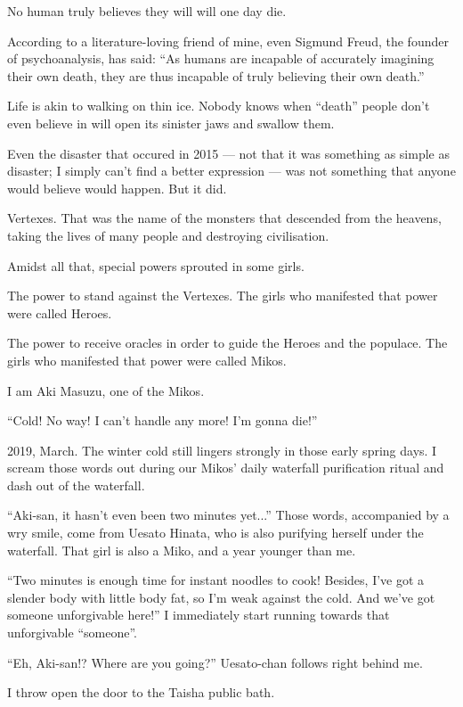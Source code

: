 

No human truly believes they will will one day die.

According to a literature-loving friend of mine, even Sigmund Freud, the founder of psychoanalysis, has said: ``As humans are incapable of accurately imagining their own death, they are thus incapable of truly believing their own death.''

Life is akin to walking on thin ice. Nobody knows when ``death'' people don't even believe in will open its sinister jaws and swallow them.

Even the disaster that occured in 2015 --- not that it was something as simple as disaster; I simply can't find a better expression --- was not something that anyone would believe would happen. But it did.

Vertexes. That was the name of the monsters that descended from the heavens, taking the lives of many people and destroying civilisation.

Amidst all that, special powers sprouted in some girls.

The power to stand against the Vertexes. The girls who manifested that power were called Heroes.

The power to receive oracles in order to guide the Heroes and the populace. The girls who manifested that power were called Mikos.

I am Aki Masuzu, one of the Mikos.

``Cold! No way! I can't handle any more! I'm gonna die!''

2019, March. The winter cold still lingers strongly in those early spring days. I scream those words out during our Mikos' daily waterfall purification ritual and dash out of the waterfall.

``Aki-san, it hasn't even been two minutes yet...''  Those words, accompanied by a wry smile, come from Uesato Hinata, who is also purifying herself under the waterfall. That girl is also a Miko, and a year younger than me.

``Two minutes is enough time for instant noodles to cook! Besides, I've got a slender body with little body fat, so I'm weak against the cold. And we've got someone unforgivable here!''  I immediately start running towards that unforgivable ``someone''.

``Eh, Aki-san!? Where are you going?''  Uesato-chan follows right behind me.

I throw open the door to the Taisha public bath.

